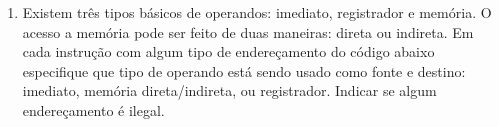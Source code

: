 \begin{enumerate}
    \item
    Existem três tipos básicos de operandos: imediato, registrador e memória.
    O acesso a memória pode ser feito de duas maneiras: direta ou indireta.
    Em cada instrução com algum tipo de endereçamento 
    do código abaixo especifique que tipo de operando 
    está sendo usado como fonte e destino:
    imediato, memória direta/indireta, ou registrador.
    Indicar se algum endereçamento é ilegal. 


\end{enumerate}
